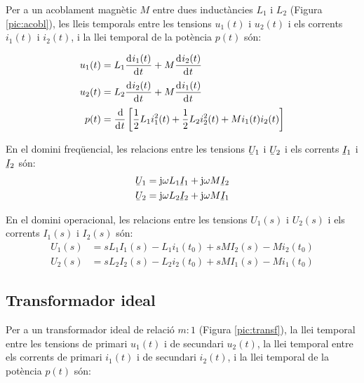 Per a un acoblament magn\`{e}tic $M$ entre dues
induct\`{a}ncies $L_1$ i $L_2$ (Figura \vref{pic:acobl}), les lleis temporals entre les
tensions $u_1(t)$ i $u_2(t)$ i els corrents $i_1(t)$ i $i_2(t)$,  i la llei temporal
de la pot\`{e}ncia $p(t)$ s\'{o}n:

\hfill
\begin{minipage}[b]{6cm}
   
   \label{pic:acobl}
\end{minipage}
\hfill
\begin{minipage}[b][3.8cm][t]{10cm}
   \begin{align}
      u_1(t) &= L_1 \deriv{i_1(t)}{t} + M \deriv{i_2(t)}{t} \\
      u_2(t) &= L_2 \deriv{i_2(t)}{t} + M \deriv{i_1(t)}{t} \\
      p(t) &= \frac{\diff}{\diff t} \left[ \frac{1}{2} L_1 i_1^2(t) + \frac{1}{2} L_2 i_2^2(t) +
      M i_1(t) i_2(t) \right]
   \end{align}
\end{minipage}


En el domini freq\"{u}encial, les relacions entre les tensions $\cmplx{U}_1$ i $\cmplx{U}_2$ i els corrents $\cmplx{I}_1$ i $\cmplx{I}_2$ s\'{o}n:
\begin{align}
   \cmplx{U}_1 &= \ju \omega L_1 \cmplx{I}_1 + \ju \omega M \cmplx{I}_2 \\
   \cmplx{U}_2 &= \ju \omega L_2 \cmplx{I}_2 + \ju \omega M \cmplx{I}_1
\end{align}

En el domini operacional, les relacions entre les tensions $U_1(s)$  i $U_2(s)$ i els corrents $I_1(s)$ i $I_2(s)$ s\'{o}n:
\begin{align}
   U_1(s) &= s L_1 I_1(s) - L_1 i_1(t_0) + s M I_2(s) - M i_2(t_0) \\
   U_2(s) &= s L_2 I_2(s) - L_2 i_2(t_0) + s M I_1(s) - M i_1(t_0)
\end{align}

\subsection{Transformador ideal} 

Per a un transformador
ideal de relaci\'{o} $m\!:\!1$ (Figura \vref{pic:transf}), la llei temporal
entre les tensions de primari $u_1(t)$ i de secundari $u_2(t)$, la
llei temporal entre els corrents de primari $i_1(t)$ i de secundari
$i_2(t)$, i la llei temporal de la pot\`{e}ncia $p(t)$ s\'{o}n:

